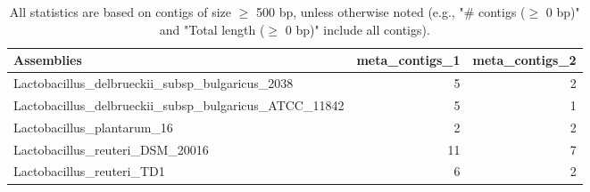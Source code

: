 \documentclass[12pt,a4paper]{article}
\begin{document}
\begin{table}[ht]
\begin{center}
\caption{All statistics are based on contigs of size $\geq$ 500 bp, unless otherwise noted (e.g., "\# contigs ($\geq$ 0 bp)" and "Total length ($\geq$ 0 bp)" include all contigs).}
\begin{tabular}{|l*{2}{|r}|}
\hline
Assemblies & meta\_contigs\_1 & meta\_contigs\_2 \\ \hline
Lactobacillus\_delbrueckii\_subsp\_bulgaricus\_2038 & 5 & 2 \\ \hline
Lactobacillus\_delbrueckii\_subsp\_bulgaricus\_ATCC\_11842 & 5 & 1 \\ \hline
Lactobacillus\_plantarum\_16 & 2 & 2 \\ \hline
Lactobacillus\_reuteri\_DSM\_20016 & 11 & 7 \\ \hline
Lactobacillus\_reuteri\_TD1 & 6 & 2 \\ \hline
\end{tabular}
\end{center}
\end{table}
\end{document}

